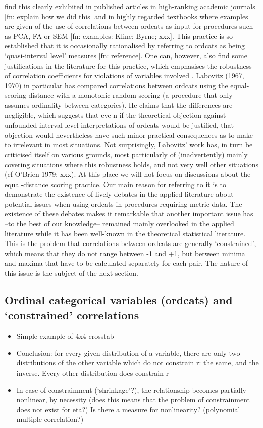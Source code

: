 \documentclass[
  12pt,
]{article}
\providecommand{\tightlist}{%
  \setlength{\itemsep}{0pt}\setlength{\parskip}{0pt}}\usepackage{longtable,booktabs,array}
\begin{document}
find this clearly exhibited in published articles in high-ranking
academic journals {[}fn: explain how we did this{]} and in highly
regarded textbooks where examples are given of the use of correlations
between ordcats as input for procedures such as PCA, FA or SEM {[}fn:
examples: Kline; Byrne; xxx{]}. This practice is so established that it
is occasionally rationalised by referring to ordcats as being
`quasi-interval level' measures {[}fn: reference{]}. One can, however,
also find some justifications in the literature for this practice, which
emphasises the robustness of correlation coefficients for violations of
variables involved . Labovitz (1967, 1970) in particular has compared
correlations between ordcats using the equal-scoring distance with a
monotonic random scoring (a procedure that only assumes ordinality
between categories). He claims that the differences are negligible,
which suggests that eve n if the theoretical objection against unfounded
interval level interpretations of ordcats would be justified, that
objection would nevertheless have such minor practical consequences as
to make to irrelevant in most situations. Not surprisingly, Labovitz'
work has, in turn be criticised itself on various grounds, most
particularly of (inadvertently) mainly covering situations where this
robustness holds, and not very well other situations (cf O'Brien 1979;
xxx). At this place we will not focus on discussions about the
equal-distance scoring practice. Our main reason for referring to it is
to demonstrate the existence of lively debates in the applied literature
about potential issues when using ordcats in procedures requiring metric
data. The existence of these debates makes it remarkable that another
important issue has --to the best of our knowledge-- remained mainly
overlooked in the applied literature while it has been well-known in the
theoretical statistical literature. This is the problem that
correlations between ordcats are generally `constrained', which means
that they do not range between -1 and +1, but between minima and maxima
that have to be calculated separately for each pair. The nature of this
issue is the subject of the next section.

\subsection{Ordinal categorical variables (ordcats) and `constrained'
correlations}\label{ordinal-categorical-variables-ordcats-and-constrained-correlations}

\begin{itemize}
\tightlist
\item
  Simple example of 4x4 crosstab
\item
  Conclusion: for every given distribution of a variable, there are only
  two distributions of the other variable which do not constrain r: the
  same, and the inverse. Every other distribution does constrain r
\item
  In case of constrainment (`shrinkage'?), the relationship becomes
  partially nonlinear, by necessity (does this means that the problem of
  constrainment does not exist for eta?) Is there a measure for
  nonlinearity? (polynomial multiple correlation?)
\end{itemize}
\end{document}
